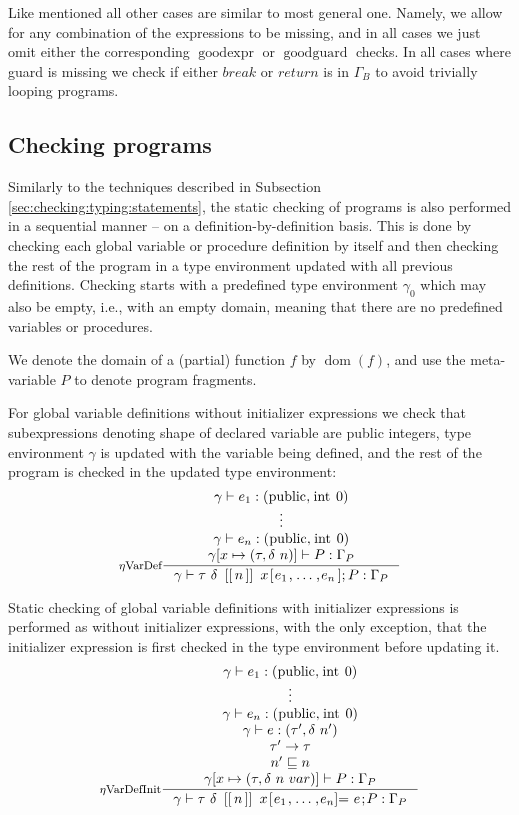 \documentclass[a4paper, 10pt, draft]{report}
\newcommand{\mycode}[1]{\ensuremath{\mbox{\lstinline{#1}}}}
\begin{document}
Like mentioned all other cases are similar to most general one. Namely, we
allow for any combination of the expressions to be missing, and in all cases we
just omit either the corresponding $\operatorname{goodexpr}$ or
$\operatorname{goodguard}$ checks. In all cases where guard is missing we check
if either $break$ or $return$ is in $\Gamma_B$ to avoid trivially looping
programs.

\subsection{Checking programs}\label{sec:checking:typing:programs}

Similarly to the techniques described in Subsection
\ref{sec:checking:typing:statements}, the static checking of programs is also
performed in a sequential manner -- on a definition-by-definition basis. This
is done by checking each global variable or procedure definition by itself and
then checking the rest of the program in a type environment updated with all
previous definitions. Checking starts with a predefined type environment
$\gamma_0$ which may also be empty, i.e., with an empty domain, meaning that
there are no predefined variables or procedures.

We denote the domain of a (partial) function $f$ by
$\operatorname{dom}\!\left(f\right)$, and use the meta-variable $P$ to denote
program fragments. 

For global variable definitions without initializer expressions we check that
subexpressions denoting shape of declared variable are public integers,
type environment $\gamma$ is updated with the variable being defined, and the
rest of the program is checked in the updated type environment:
\[ \inference[$\eta$VarDef]{
  \gamma |- e_1 : \left( \mycode{public}, \mycode{int}\ 0 \right) \\
  \vdots \\
  \gamma |- e_n : \left( \mycode{public}, \mycode{int}\ 0 \right) \\
  \gamma[x \mapsto \left( \tau, \delta\ n \right)] |- P : \Gamma_P
}{
  \gamma |- \tau\ \delta\ \mycode{[[}n\mycode{]]}\ x\mycode{[} e_1 \mycode{,} \ldots \mycode{,} e_n  \mycode{];} P : \Gamma_P
} \]

Static checking of global variable definitions with initializer expressions is
performed as without initializer expressions, with the only exception, that the
initializer expression is first checked in the type environment before updating
it.
\[ \inference[$\eta$VarDefInit]{
  \gamma |- e_1 : \left( \mycode{public}, \mycode{int}\ 0 \right) \\
  \vdots \\
  \gamma |- e_n : \left( \mycode{public}, \mycode{int}\ 0 \right) \\
  \gamma |- e : \left( \tau', \delta\ n' \right) \\
  \tau' \to \tau \\
  n' \sqsubseteq n \\
  \gamma[x \mapsto (\tau, \delta\ n\ var)] |- P : \Gamma_P
}{
  \gamma |- \tau\ \delta\ \mycode{[[}n\mycode{]]}\ x\mycode{[} e_1 \mycode{,} \ldots \mycode{,} e_n  \mycode{]=}\ e\mycode{;} P : \Gamma_P
} \]
\end{document}
